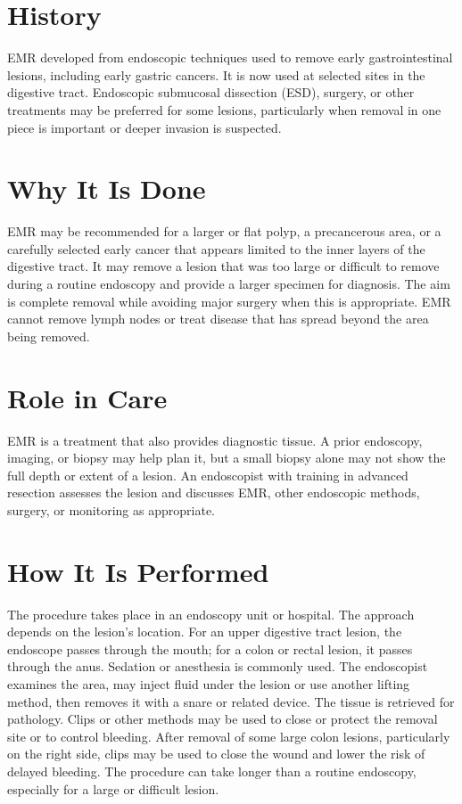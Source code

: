 \section*{History}
EMR developed from endoscopic techniques used to remove early gastrointestinal lesions, including early gastric cancers. It is now used at selected sites in the digestive tract. Endoscopic submucosal dissection (ESD), surgery, or other treatments may be preferred for some lesions, particularly when removal in one piece is important or deeper invasion is suspected.

\section*{Why It Is Done}
EMR may be recommended for a larger or flat polyp, a precancerous area, or a carefully selected early cancer that appears limited to the inner layers of the digestive tract. It may remove a lesion that was too large or difficult to remove during a routine endoscopy and provide a larger specimen for diagnosis. The aim is complete removal while avoiding major surgery when this is appropriate. EMR cannot remove lymph nodes or treat disease that has spread beyond the area being removed.

\section*{Role in Care}
EMR is a treatment that also provides diagnostic tissue. A prior endoscopy, imaging, or biopsy may help plan it, but a small biopsy alone may not show the full depth or extent of a lesion. An endoscopist with training in advanced resection assesses the lesion and discusses EMR, other endoscopic methods, surgery, or monitoring as appropriate.

\section*{How It Is Performed}
The procedure takes place in an endoscopy unit or hospital. The approach depends on the lesion's location. For an upper digestive tract lesion, the endoscope passes through the mouth; for a colon or rectal lesion, it passes through the anus. Sedation or anesthesia is commonly used. The endoscopist examines the area, may inject fluid under the lesion or use another lifting method, then removes it with a snare or related device. The tissue is retrieved for pathology. Clips or other methods may be used to close or protect the removal site or to control bleeding. After removal of some large colon lesions, particularly on the right side, clips may be used to close the wound and lower the risk of delayed bleeding. The procedure can take longer than a routine endoscopy, especially for a large or difficult lesion.

